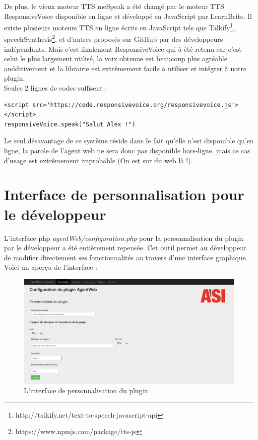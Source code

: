 \documentclass[11pt,dvipsnames,svgnames]{report}
\begin{document}
	 De plus, le vieux moteur TTS meSpeak a été changé par le moteur TTS ResponsiveVoice disponible en ligne et développé en JavaScript par LearnBrite. Il existe plusieurs moteurs TTS en ligne écrits en JavaScript tels que Talkify\footnote{http://talkify.net/text-to-speech-javascript-api}, speechSynthesis\footnote{https://www.npmjs.com/package/tts-js}, et d'autres proposés sur GitHub par des développeurs indépendants. Mais c'est finalement ResponsiveVoice qui à été retenu car c'est celui le plus largement utilisé, la voix obtenue est beaucoup plus agréable audditivement et la librairie est extrêmement facile à utiliser et intégrer à notre plugin.\\
	 
	 Seules 2 lignes de codes suffisent :\\
	\begin{lstlisting}
<script src='https://code.responsivevoice.org/responsivevoice.js'></script>
responsiveVoice.speak("Salut Alex !")
\end{lstlisting}
	
	Le seul désavantage de ce système réside dans le fait qu'elle n'est disponible qu'en ligne, la parole de l'agent web ne sera donc pas disponible hors-ligne, mais ce cas d'usage est extrêmement improbable (On est sur du web là !).
	
	\section{Interface de personnalisation pour le développeur}
	
	L'interface php \emph{agentWeb/configuration.php} pour la personnalisation du plugin par le développeur a été entièrement repensée. Cet outil permet au développeur de modifier directement ses fonctionnalités au travers d'une interface graphique. Voici un aperçu de l'interface :\\
	
	\begin{figure}[H]
\centerline{\includegraphics[width=1\textwidth]{images/conf.png}}
\caption{L'interface de personnalisation du plugin}
\end{figure} 
	
\end{document}
